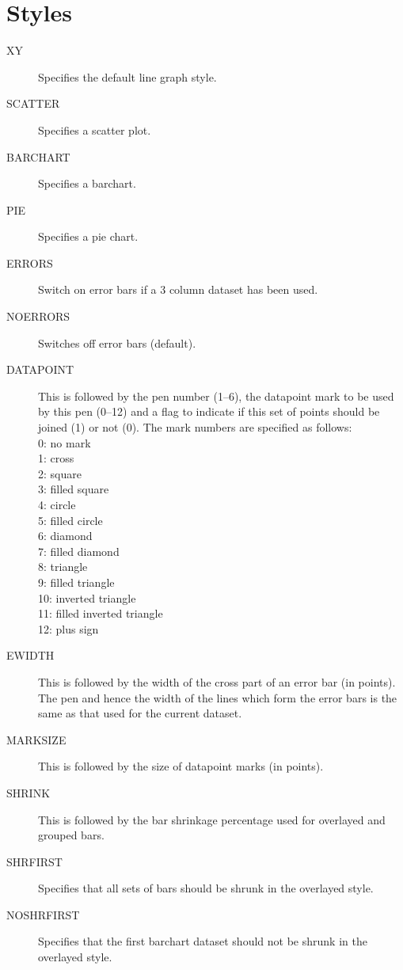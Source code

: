 \section{Styles}
\label{sec:styles}
\begin{description}
\item[XY] Specifies the default line graph style.
\item[SCATTER] Specifies a scatter plot.
\item[BARCHART] Specifies a barchart.
\item[PIE] Specifies a pie chart.
\item[ERRORS] Switch on error bars if a 3 column dataset has been used.
\item[NOERRORS] Switches off error bars (default).
\item[DATAPOINT] This is followed by the pen number (1--6), the datapoint mark
to be used by this pen (0--12) and a flag to indicate if this set of points should 
be joined (1) or not (0). The mark numbers are specified as follows:\\
0: no mark\\
1: cross\\
2: square\\
3: filled square\\
4: circle\\
5: filled circle\\
6: diamond\\
7: filled diamond\\
8: triangle\\
9: filled triangle\\
10: inverted triangle\\
11: filled inverted triangle\\
12: plus sign
\item[EWIDTH] This is followed by the width of the cross part of an error bar (in 
points). The pen and hence the width of the lines which form the error bars is the 
same as that used for the current dataset.
\item[MARKSIZE] This is followed by the size of datapoint marks (in points).
\item[SHRINK] This is followed by the bar shrinkage percentage used for overlayed 
and grouped bars.
\item[SHRFIRST] Specifies that all sets of bars should be shrunk in the overlayed 
style.
\item[NOSHRFIRST\dag] Specifies that the first barchart dataset should not be shrunk 
in the overlayed style.

\end{description}
